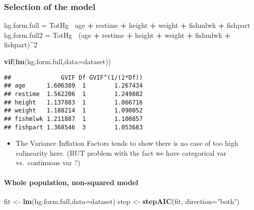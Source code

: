 \documentclass[12pt,]{article}
\newenvironment{Shaded}{\begin{snugshade}}{\end{snugshade}}
\newcommand{\KeywordTok}[1]{\textcolor[rgb]{0.13,0.29,0.53}{\textbf{#1}}}
\newcommand{\DataTypeTok}[1]{\textcolor[rgb]{0.13,0.29,0.53}{#1}}
\newcommand{\DecValTok}[1]{\textcolor[rgb]{0.00,0.00,0.81}{#1}}
\newcommand{\StringTok}[1]{\textcolor[rgb]{0.31,0.60,0.02}{#1}}
\newcommand{\OperatorTok}[1]{\textcolor[rgb]{0.81,0.36,0.00}{\textbf{#1}}}
\newcommand{\NormalTok}[1]{#1}
\providecommand{\tightlist}{%
  \setlength{\itemsep}{0pt}\setlength{\parskip}{0pt}}
\let\oldparagraph\paragraph
\renewcommand{\paragraph}[1]{\oldparagraph{#1}\mbox{}}
\begin{document}
\subsubsection{Selection of the model}\label{selection-of-the-model}

\begin{Shaded}
\begin{Highlighting}[]
\NormalTok{hg.form.full =}\StringTok{ }\NormalTok{TotHg}\OperatorTok{~}\StringTok{ }\NormalTok{age }\OperatorTok{+}\StringTok{ }\NormalTok{restime }\OperatorTok{+}\StringTok{ }\NormalTok{height }\OperatorTok{+}\StringTok{ }\NormalTok{weight }\OperatorTok{+}\StringTok{ }\NormalTok{fishmlwk }\OperatorTok{+}\StringTok{ }\NormalTok{fishpart }
\NormalTok{hg.form.full2 =}\StringTok{ }\NormalTok{TotHg}\OperatorTok{~}\StringTok{ }\NormalTok{(age }\OperatorTok{+}\StringTok{ }\NormalTok{restime }\OperatorTok{+}\StringTok{ }\NormalTok{height }\OperatorTok{+}\StringTok{ }\NormalTok{weight }\OperatorTok{+}\StringTok{ }\NormalTok{fishmlwk }\OperatorTok{+}\StringTok{ }\NormalTok{fishpart)}\OperatorTok{^}\DecValTok{2}

\KeywordTok{vif}\NormalTok{(}\KeywordTok{lm}\NormalTok{(hg.form.full,}\DataTypeTok{data=}\NormalTok{dataset))}
\end{Highlighting}
\end{Shaded}

\begin{verbatim}
##              GVIF Df GVIF^(1/(2*Df))
## age      1.606389  1        1.267434
## restime  1.562206  1        1.249882
## height   1.137883  1        1.066716
## weight   1.188214  1        1.090052
## fishmlwk 1.211887  1        1.100857
## fishpart 1.368546  3        1.053683
\end{verbatim}

\begin{itemize}
\tightlist
\item
  The Variance Inflation Factors tends to show there is no case of too
  high colinearity here. (BUT problem with the fact we have categorical
  var vs.~continuous var ?)
\end{itemize}

\paragraph{Whole population, non-squared
model}\label{whole-population-non-squared-model}

\begin{Shaded}
\begin{Highlighting}[]
\NormalTok{fit <-}\StringTok{ }\KeywordTok{lm}\NormalTok{(hg.form.full,}\DataTypeTok{data=}\NormalTok{dataset)}
\NormalTok{step <-}\StringTok{ }\KeywordTok{stepAIC}\NormalTok{(fit, }\DataTypeTok{direction=}\StringTok{"both"}\NormalTok{)}
\end{Highlighting}
\end{Shaded}
\end{document}
